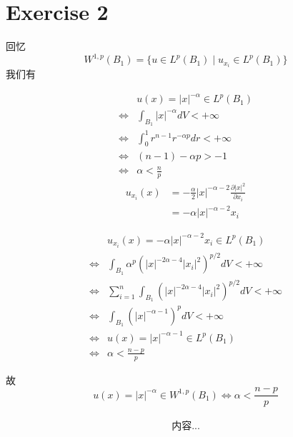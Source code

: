 \documentclass{ctexart}
\numberwithin{equation}{section}
\theoremstyle{plain}
\theoremstyle{plain}
\numberwithin{equation}{section}
\theoremstyle{remark}
\begin{document}
\section{Exercise 2}
回忆
$$W^{1,p}(B_1)=\{u \in L^p(B_1) \mid u_{x_i} \in L^p(B_1)\}$$
我们有

\begin{minipage}[t]{.4\textwidth}
\centering
\begin{equation*}
\begin{aligned}
	& u(x)=|x|^{-\alpha} \in L^p(B_1)\\
	\Leftrightarrow & \int_{B_1}|x|^{-\alpha}dV < +\infty\\
	\Leftrightarrow & \int_{0}^{1}r^{n-1}r^{-\alpha p}dr < +\infty\\
	\Leftrightarrow & (n-1)-\alpha p >-1\\
	\Leftrightarrow & \alpha < \frac{n}{p}
\end{aligned}
\end{equation*}
\begin{equation*}
\begin{aligned}
u_{x_i}(x)&=-\frac{\alpha}{2}|x|^{-\alpha-2}\frac{\partial |x|^2}{\partial x_i}\\
&=-\alpha |x|^{-\alpha-2}x_i
\end{aligned}
\end{equation*}
\end{minipage}
\begin{minipage}[t]{.6\textwidth}
\centering
\begin{equation*}
\begin{aligned}
& u_{x_i}(x)=-\alpha |x|^{-\alpha-2}x_i \in L^p(B_1)\\
\Leftrightarrow & \int_{B_1} \alpha^p (|x|^{-2\alpha -4}|x_i|^2)^{p/2} dV< +\infty\\
\Leftrightarrow & \sum_{i=1}^{n}\int_{B_1} (|x|^{-2\alpha -4}|x_i|^2)^{p/2} dV< +\infty\\
\Leftrightarrow & \int_{B_1} (|x|^{-\alpha -1})^p dV< +\infty\\
\Leftrightarrow	& u(x)=|x|^{-\alpha-1} \in L^p(B_1)\\
\Leftrightarrow & \alpha < \frac{n-p}{p}
\end{aligned}
\end{equation*}
\end{minipage}
故
$$u(x)=|x|^{-\alpha} \in W^{1,p}(B_1) \Longleftrightarrow \alpha < \frac{n-p}{p}$$

\begin{equation*}
\begin{aligned}
内容...
\end{aligned}
\end{equation*}
             
\end{document}
